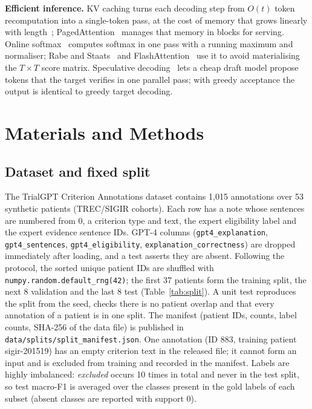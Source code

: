 \documentclass[conference]{IEEEtran}
\begin{document}
\textbf{Efficient inference.} KV caching turns each decoding step from $O(t)$ token recomputation into a single-token pass, at the cost of memory that grows linearly with length~\cite{pope2023efficiently}; PagedAttention~\cite{kwon2023paged} manages that memory in blocks for serving. Online softmax~\cite{milakov2018online} computes softmax in one pass with a running maximum and normaliser; Rabe and Staats~\cite{rabe2021selfattention} and FlashAttention~\cite{dao2022flashattention,dao2024flashattention2} use it to avoid materialising the $T\times T$ score matrix. Speculative decoding~\cite{leviathan2023fast,chen2023accelerating} lets a cheap draft model propose tokens that the target verifies in one parallel pass; with greedy acceptance the output is identical to greedy target decoding.

\section{Materials and Methods}
\subsection{Dataset and fixed split}
The TrialGPT Criterion Annotations dataset contains 1{,}015 annotations over 53 synthetic patients (TREC/SIGIR cohorts). Each row has a note whose sentences are numbered from 0, a criterion type and text, the expert eligibility label and the expert evidence sentence IDs. GPT-4 columns (\texttt{gpt4\_explanation}, \texttt{gpt4\_sentences}, \texttt{gpt4\_eligibility}, \texttt{explanation\_correctness}) are dropped immediately after loading, and a test asserts they are absent. Following the protocol, the sorted unique patient IDs are shuffled with \texttt{numpy.random.default\_rng(42)}; the first 37 patients form the training split, the next 8 validation and the last 8 test (Table~\ref{tab:split}). A unit test reproduces the split from the seed, checks there is no patient overlap and that every annotation of a patient is in one split. The manifest (patient IDs, counts, label counts, SHA-256 of the data file) is published in \texttt{data/splits/split\_manifest.json}. One annotation (ID 883, training patient sigir-201519) has an empty criterion text in the released file; it cannot form an input and is excluded from training and recorded in the manifest. Labels are highly imbalanced: \emph{excluded} occurs 10 times in total and never in the test split, so test macro-F1 is averaged over the classes present in the gold labels of each subset (absent classes are reported with support 0).
\end{document}

